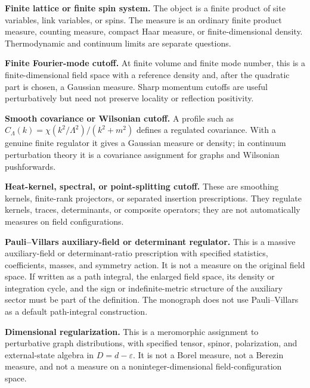 \begin{table}[H]
\centering
\footnotesize
\begin{minipage}{0.94\textwidth}
\textbf{Finite lattice or finite spin system.}
The object is a finite product of site variables, link variables, or spins.
The measure is an ordinary finite product measure, counting measure, compact
Haar measure, or finite-dimensional density.  Thermodynamic and continuum
limits are separate questions.\par\smallskip

\textbf{Finite Fourier-mode cutoff.}
At finite volume and finite mode number, this is a finite-dimensional field
space with a reference density and, after the quadratic part is chosen, a
Gaussian measure.  Sharp momentum cutoffs are useful perturbatively but need
not preserve locality or reflection positivity.\par\smallskip

\textbf{Smooth covariance or Wilsonian cutoff.}
A profile such as
\(C_\Lambda(k)=\chi(k^2/\Lambda^2)/(k^2+m^2)\) defines a regulated covariance.
With a genuine finite regulator it gives a Gaussian measure or density; in
continuum perturbation theory it is a covariance assignment for graphs and
Wilsonian pushforwards.\par\smallskip

\textbf{Heat-kernel, spectral, or point-splitting cutoff.}
These are smoothing kernels, finite-rank projectors, or separated insertion
prescriptions.  They regulate kernels, traces, determinants, or composite
operators; they are not automatically measures on field configurations.\par\smallskip

\textbf{Pauli--Villars auxiliary-field or determinant regulator.}
This is a massive auxiliary-field or determinant-ratio prescription with
specified statistics, coefficients, masses, and symmetry action.  It is not a
measure on the original field space.  If written as a path integral, the
enlarged field space, its density or integration cycle, and the sign or
indefinite-metric structure of the auxiliary sector must be part of the
definition.  The monograph does not use Pauli--Villars as a default
path-integral construction.\par\smallskip

\textbf{Dimensional regularization.}
This is a meromorphic assignment to perturbative graph distributions, with
specified tensor, spinor, polarization, and external-state algebra in
\(D=d-\varepsilon\).  It is not a Borel measure, not a Berezin measure, and
not a measure on a noninteger-dimensional field-configuration space.\par\smallskip


\end{minipage}
\end{table}
